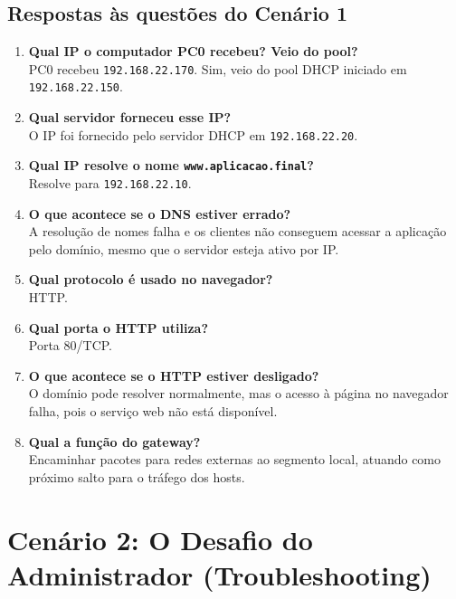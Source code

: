 \documentclass[12pt,a4paper]{article}
\begin{document}
\subsection*{Respostas às questões do Cenário 1}

\begin{enumerate}
\item \textbf{Qual IP o computador PC0 recebeu? Veio do pool?}\\
PC0 recebeu \texttt{192.168.22.170}. Sim, veio do pool DHCP iniciado em \texttt{192.168.22.150}.

\item \textbf{Qual servidor forneceu esse IP?}\\
O IP foi fornecido pelo servidor DHCP em \texttt{192.168.22.20}.

\item \textbf{Qual IP resolve o nome \texttt{www.aplicacao.final}?}\\
Resolve para \texttt{192.168.22.10}.

\item \textbf{O que acontece se o DNS estiver errado?}\\
A resolução de nomes falha e os clientes não conseguem acessar a aplicação pelo domínio, mesmo que o servidor esteja ativo por IP.

\item \textbf{Qual protocolo é usado no navegador?}\\
HTTP.

\item \textbf{Qual porta o HTTP utiliza?}\\
Porta 80/TCP.

\item \textbf{O que acontece se o HTTP estiver desligado?}\\
O domínio pode resolver normalmente, mas o acesso à página no navegador falha, pois o serviço web não está disponível.

\item \textbf{Qual a função do gateway?}\\
Encaminhar pacotes para redes externas ao segmento local, atuando como próximo salto para o tráfego dos hosts.
\end{enumerate}

\newpage
\section*{Cenário 2: O Desafio do Administrador (Troubleshooting)}
\end{document}
